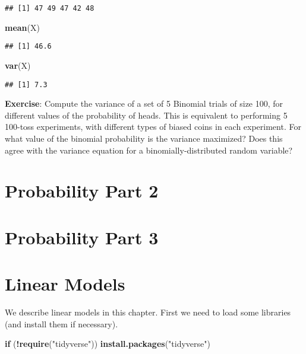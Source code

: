 \documentclass[
]{book}
\newenvironment{Shaded}{\begin{snugshade}}{\end{snugshade}}
\newcommand{\ControlFlowTok}[1]{\textcolor[rgb]{0.13,0.29,0.53}{\textbf{#1}}}
\newcommand{\KeywordTok}[1]{\textcolor[rgb]{0.13,0.29,0.53}{\textbf{#1}}}
\newcommand{\NormalTok}[1]{#1}
\newcommand{\OperatorTok}[1]{\textcolor[rgb]{0.81,0.36,0.00}{\textbf{#1}}}
\newcommand{\StringTok}[1]{\textcolor[rgb]{0.31,0.60,0.02}{#1}}
\begin{document}
\begin{verbatim}
## [1] 47 49 47 42 48
\end{verbatim}

\begin{Shaded}
\begin{Highlighting}[]
\KeywordTok{mean}\NormalTok{(X)}
\end{Highlighting}
\end{Shaded}

\begin{verbatim}
## [1] 46.6
\end{verbatim}

\begin{Shaded}
\begin{Highlighting}[]
\KeywordTok{var}\NormalTok{(X)}
\end{Highlighting}
\end{Shaded}

\begin{verbatim}
## [1] 7.3
\end{verbatim}

\textbf{Exercise}: Compute the variance of a set of 5 Binomial trials of size 100, for different values of the probability of heads. This is equivalent to performing 5 100-toss experiments, with different types of biased coins in each experiment. For what value of the binomial probability is the variance maximized? Does this agree with the variance equation for a binomially-distributed random variable?

\hypertarget{probability-part-2}{%
\chapter{Probability Part 2}\label{probability-part-2}}

\hypertarget{probability-part-3}{%
\chapter{Probability Part 3}\label{probability-part-3}}

\hypertarget{linear-models}{%
\chapter{Linear Models}\label{linear-models}}

We describe linear models in this chapter. First we need to load some libraries (and install them if necessary).

\begin{Shaded}
\begin{Highlighting}[]
\ControlFlowTok{if}\NormalTok{ (}\OperatorTok{!}\KeywordTok{require}\NormalTok{(}\StringTok{"tidyverse"}\NormalTok{)) }\KeywordTok{install.packages}\NormalTok{(}\StringTok{"tidyverse"}\NormalTok{)}
\end{Highlighting}
\end{Shaded}
\end{document}
